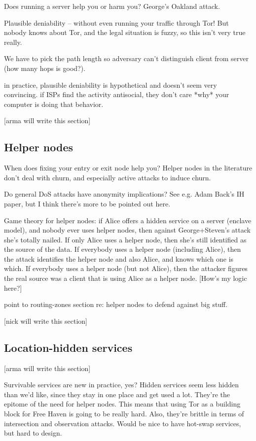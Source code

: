\documentclass{llncs}
\begin{document}
Does running a server help you or harm you? George's Oakland attack.

Plausible deniability -- without even running your traffic through Tor!
But nobody knows about Tor, and the legal situation is fuzzy, so this
isn't very true really.

We have to pick the path length so adversary can't distinguish client from
server (how many hops is good?).

in practice, plausible deniability is hypothetical and doesn't seem very
convincing. if ISPs find the activity antisocial, they don't care *why*
your computer is doing that behavior.

[arma will write this section]

\subsection{Helper nodes}

When does fixing your entry or exit node help you?
Helper nodes in the literature don't deal with churn, and
especially active attacks to induce churn.

Do general DoS attacks have anonymity implications? See e.g. Adam
Back's IH paper, but I think there's more to be pointed out here.

Game theory for helper nodes: if Alice offers a hidden service on a
server (enclave model), and nobody ever uses helper nodes, then against
George+Steven's attack she's totally nailed. If only Alice uses a helper
node, then she's still identified as the source of the data. If everybody
uses a helper node (including Alice), then the attack identifies the
helper node and also Alice, and knows which one is which. If everybody
uses a helper node (but not Alice), then the attacker figures the real
source was a client that is using Alice as a helper node. [How's my
logic here?]

point to routing-zones section re: helper nodes to defend against
big stuff.

[nick will write this section]

\subsection{Location-hidden services}

[arma will write this section]

Survivable services are new in practice, yes? Hidden services seem
less hidden than we'd like, since they stay in one place and get used
a lot. They're the epitome of the need for helper nodes. This means
that using Tor as a building block for Free Haven is going to be really
hard. Also, they're brittle in terms of intersection and observation
attacks. Would be nice to have hot-swap services, but hard to design.
\end{document}
